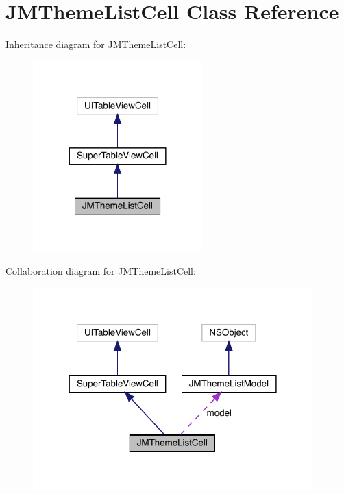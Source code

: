 \hypertarget{interface_j_m_theme_list_cell}{}\section{J\+M\+Theme\+List\+Cell Class Reference}
\label{interface_j_m_theme_list_cell}


Inheritance diagram for J\+M\+Theme\+List\+Cell\+:\nopagebreak
\begin{figure}[H]
\begin{center}
\leavevmode
\includegraphics[width=185pt]{interface_j_m_theme_list_cell__inherit__graph}
\end{center}
\end{figure}


Collaboration diagram for J\+M\+Theme\+List\+Cell\+:\nopagebreak
\begin{figure}[H]
\begin{center}
\leavevmode
\includegraphics[width=306pt]{interface_j_m_theme_list_cell__coll__graph}
\end{center}
\end{figure}
